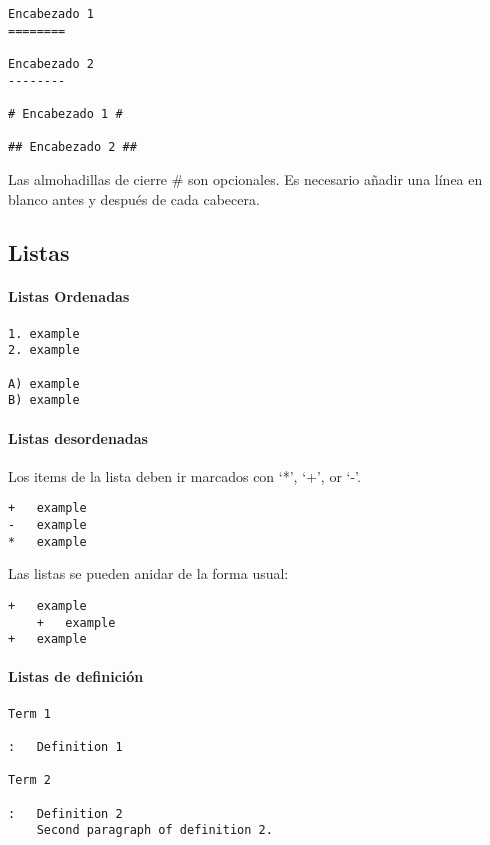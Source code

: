 \documentclass[12pt,spanish,]{article}
\let\oldparagraph\paragraph
\renewcommand{\paragraph}[1]{\oldparagraph{#1}\mbox{}}
\begin{document}
\begin{verbatim}
Encabezado 1
========

Encabezado 2
--------

# Encabezado 1 #

## Encabezado 2 ##
\end{verbatim}

Las almohadillas de cierre \# son opcionales. Es necesario añadir una
línea en blanco antes y después de cada cabecera.

\subsection{Listas}\label{listas}

\paragraph{Listas Ordenadas}\label{listas-ordenadas}

\begin{verbatim}
1. example
2. example

A) example
B) example
\end{verbatim}

\paragraph{Listas desordenadas}\label{listas-desordenadas}

Los items de la lista deben ir marcados con `*', `+', or `-'.

\begin{verbatim}
+   example
-   example
*   example
\end{verbatim}

Las listas se pueden anidar de la forma usual:

\begin{verbatim}
+   example
    +   example
+   example
\end{verbatim}

\paragraph{Listas de definición}\label{listas-de-definiciuxf3n}

\begin{verbatim}
Term 1

:   Definition 1

Term 2

:   Definition 2
    Second paragraph of definition 2.
\end{verbatim}
\end{document}

